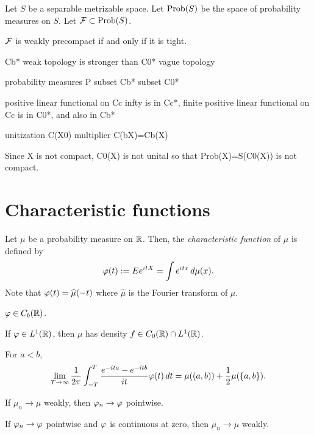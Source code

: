 \documentclass{../note}
\begin{document}
\begin{prb}
Let $S$ be a separable metrizable space.
Let $\operatorname{Prob}(S)$ be the space of probability measures on $S$.
Let $\mathcal{F}\subset\operatorname{Prob}(S)$.
\begin{parts}
\item $\mathcal{F}$ is weakly precompact if and only if it is tight.
\end{parts}
\end{prb}

Cb* weak topology is stronger than  C0* vague topology

probability measures P subset Cb* subset C0*

positive linear functional on Cc infty is in Cc*,
finite positive linear functional on Cc is in C0*, and also in Cb*


unitization C(X0)
multiplier  C(bX)=Cb(X)

Since X is not compact, C0(X) is not unital so that Prob(X)=S(C0(X)) is not compact.






\section{Characteristic functions}

\begin{prb}
Let $\mu$ be a probability measure on $\mathbb{R}$.
Then, the \emph{characteristic function} of $\mu$ is defined by
\[\varphi(t):=Ee^{itX}=\int e^{itx}\,d\mu(x).\]
Note that $\varphi(t)=\widehat\mu(-t)$ where $\hat\mu$ is the Fourier transform of $\mu$.
\begin{parts}
\item $\varphi\in C_b(\mathbb{R})$.
\item If $\varphi\in L^1(\mathbb{R})$, then $\mu$ has density $f\in C_0(\mathbb{R})\cap L^1(\mathbb{R})$.
\end{parts}
\end{prb}

\begin{prb}
For $a<b$,
\[\lim_{T\to\infty}\frac1{2\pi}\int_{-T}^T\frac{e^{-ita}-e^{-itb}}{it}\varphi(t)\,dt=\mu((a,b))+\frac12\mu(\{a,b\}).\]
\end{prb}

\begin{prb}
\begin{parts}
\item If $\mu_n\to\mu$ weakly, then $\varphi_n\to\varphi$ pointwise.
\item If $\varphi_n\to\varphi$ pointwise and $\varphi$ is continuous at zero, then $\mu_n\to\mu$ weakly.
\end{parts}
\end{prb}
\end{document}
